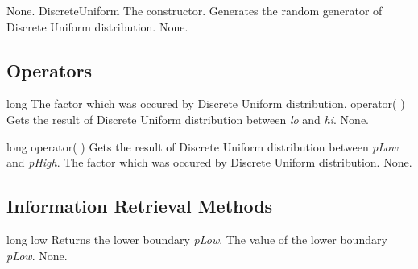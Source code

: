 \clearpage

\setNormalInstance
\setCorrectWidthThree{8pt}
\printMethodWithParamsSaved
{}
{None.}
{DiscreteUniform}
{The constructor. Generates the random generator of Discrete Uniform distribution.}
{None.}
\setCorrectWidthThree{4pt}

\vspace*{10mm}

\subsection{Operators}

\setNormalInstance
\setCorrectWidthThree{8pt}
\printMethodWithParamsSaved
{long}
{The factor which was occured by Discrete Uniform distribution.}
{operator( )}
{Gets the result of Discrete Uniform distribution between {\em lo} and
{\em hi}.}
{None.}
\setCorrectWidthThree{4pt}

\setNormalInstance
\printEmptyMethodReturnSpecial
{long}
{operator( )}
{Gets the result of Discrete Uniform distribution between {\em pLow}
and {\em pHigh}.}
{The factor which was occured by Discrete Uniform distribution.}
{None.}

\clearpage

\subsection{Information Retrieval Methods}

\setConstInstance
\printEmptyMethodReturnSpecial
{long}
{low}
{Returns the lower boundary {\em pLow}.}
{The value of the lower boundary {\em pLow}.}
{None.}

